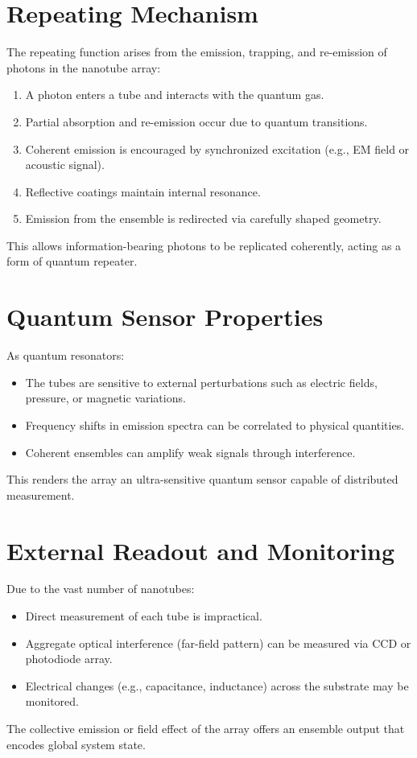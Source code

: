 \documentclass[11pt]{article}
\begin{document}
	\section{Repeating Mechanism}
	The repeating function arises from the emission, trapping, and re-emission of photons in the nanotube array:
	\begin{enumerate}
		\item A photon enters a tube and interacts with the quantum gas.
		\item Partial absorption and re-emission occur due to quantum transitions.
		\item Coherent emission is encouraged by synchronized excitation (e.g., EM field or acoustic signal).
		\item Reflective coatings maintain internal resonance.
		\item Emission from the ensemble is redirected via carefully shaped geometry.
	\end{enumerate}
	This allows information-bearing photons to be replicated coherently, acting as a form of quantum repeater.
	
	\section{Quantum Sensor Properties}
	As quantum resonators:
	\begin{itemize}
		\item The tubes are sensitive to external perturbations such as electric fields, pressure, or magnetic variations.
		\item Frequency shifts in emission spectra can be correlated to physical quantities.
		\item Coherent ensembles can amplify weak signals through interference.
	\end{itemize}
	This renders the array an ultra-sensitive quantum sensor capable of distributed measurement.
	
	\section{External Readout and Monitoring}
	Due to the vast number of nanotubes:
	\begin{itemize}
		\item Direct measurement of each tube is impractical.
		\item Aggregate optical interference (far-field pattern) can be measured via CCD or photodiode array.
		\item Electrical changes (e.g., capacitance, inductance) across the substrate may be monitored.
	\end{itemize}
	The collective emission or field effect of the array offers an ensemble output that encodes global system state.
	
\end{document}
